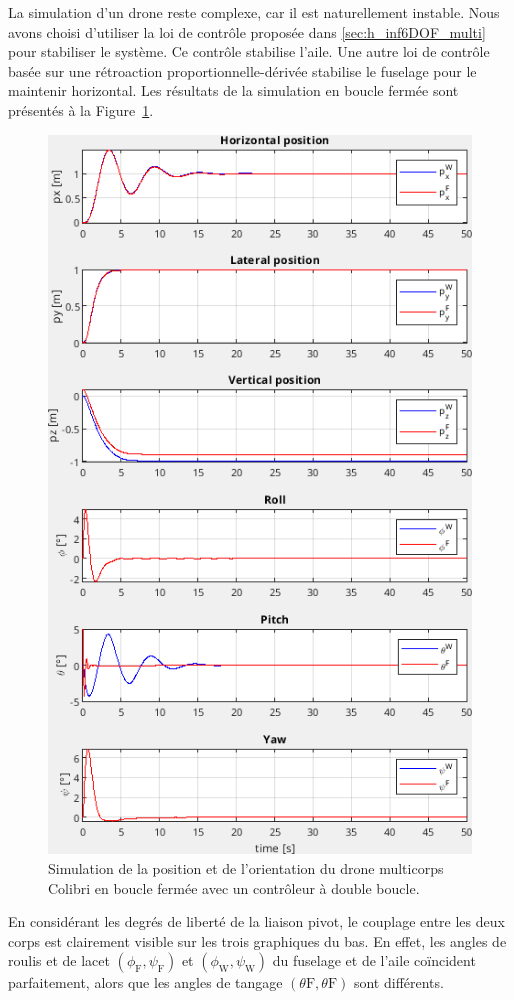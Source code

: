 La simulation d'un drone reste complexe, car il est naturellement instable. Nous avons choisi d'utiliser la loi de contrôle proposée dans \ref{sec:h_inf6DOF_multi} pour stabiliser le système. Ce contrôle stabilise l'aile. Une autre loi de contrôle basée sur une rétroaction proportionnelle-dérivée stabilise le fuselage pour le maintenir horizontal. Les résultats de la simulation en boucle fermée sont présentés à la Figure~\ref{fig:sim_colibri}.

\begin{figure}[ht!]
\centering
    \includegraphics[width=0.6\columnwidth,angle=0]{figures/colibri_sim.png}
    \caption{Simulation de la position et de l'orientation du drone multicorps Colibri en boucle fermée avec un contrôleur à double boucle. }
    \label{fig:sim_colibri}
\end{figure}

En considérant les degrés de liberté de la liaison pivot, le couplage entre les deux corps est clairement visible sur les trois graphiques du bas. En effet, les angles de roulis et de lacet $(\phi_{\text{F}}, \psi_{\text{F}})$ et $(\phi_{\text{W}}, \psi_{\text{W}})$ du fuselage et de l'aile coïncident parfaitement, alors que les angles de tangage $(\theta{\text{F}}, \theta{\text{F}})$ sont différents.








